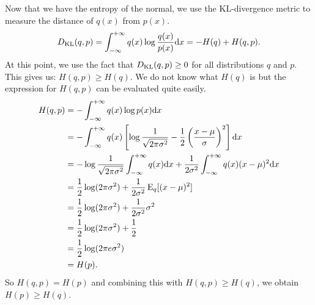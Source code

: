Now that we have the entropy of the normal, we use the KL-divergence metric 
to measure the distance of $q(x)$ from $p(x)$. 
\begin{align*}
    D_{\text{KL}} (q, p) = \int_{- \infty}^{+ \infty} q(x) \log \frac{q(x)}{p(x)} \mathrm{d} x = - H(q) + H(q, p).
\end{align*}
At this point, we use the fact that $D_{\text{KL}} (q, p) \geq 0$ for all distributions $q$ and $p$.
This gives us: $H(q, p) \geq H(q)$. We do not know what $H(q)$ is but the expression 
for $H(q, p)$ can be evaluated quite easily.
\begin{align*}
    H(q, p) & = - \int_{- \infty}^{+ \infty} q(x) \log p(x) \mathrm{d} x \\
            & =  - \int_{- \infty}^{+ \infty} q(x) 
                \left [ \log \frac{1}{\sqrt{2 \pi \sigma^2}} 
                - \frac{1}{2} \left ( \frac{x - \mu}{\sigma} \right )^2 \right ] \mathrm{d} x \\
            & = - \log \frac{1}{\sqrt{2 \pi \sigma^2}}  \int_{- \infty}^{+ \infty} q(x) \mathrm{d} x + 
                \frac{1}{2 \sigma^2} \int_{- \infty}^{+ \infty} q(x) ( x - \mu )^2 \mathrm{d} x\\
            & = \frac{1}{2} \log (2 \pi \sigma^2) + \frac{1}{2 \sigma^2} \operatorname{E}_{q} [(x - \mu)^2] \\
            & = \frac{1}{2} \log (2 \pi \sigma^2) + \frac{1}{2 \sigma^2} \sigma^2 \\
            & = \frac{1}{2} \log (2 \pi \sigma^2) + \frac{1}{2} \\
            & = \frac{1}{2} \log (2 \pi e \sigma^2) \\
            & = H(p).
\end{align*}
So $H(q, p) = H(p)$ and combining this with $H(q, p) \geq H(q)$, we 
obtain $H(p) \geq H(q)$.
